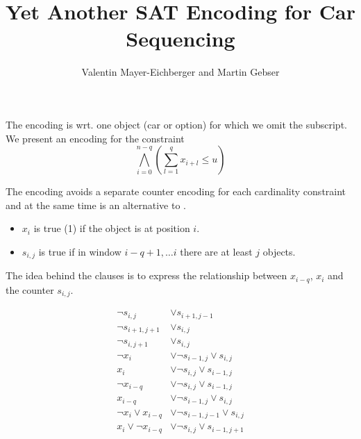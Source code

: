 \documentclass{article}
\title{Yet Another SAT Encoding for Car Sequencing}
\author{Valentin Mayer-Eichberger and Martin Gebser}
\begin{document}
\maketitle

The encoding is wrt. one object (car or option) for which we omit the
subscript. We present an encoding for the constraint
$$\bigwedge_{i=0}^{n-q}(\sum_{l=1}^q x_{i+l} \leq u )$$

The encoding avoids a separate counter encoding for each cardinality
constraint and  at the same time is an alternative to \cite{Mayer13}. 

\begin{itemize}
    \item $x_i$ is true (1) if the object is at position $i$. 
    \item $s_{i,j}$ is true if in window $i-q+1, \ldots i$ there are at least $j$ objects. 
\end{itemize}

The idea behind the clauses is to express the relationship between $x_{i-q}$,
$x_i$ and the counter $s_{i,j}$. 

\begin{align}
    \neg s_{i,j} & \vee s_{i+1,j-1} \\
    \neg s_{i+1,j+1} & \vee s_{i,j} \\
    \neg s_{i,j+1} & \vee s_{i,j} \\
    \neg x_i & \vee \neg s_{i-1,j} \vee s_{i,j} \\
         x_i & \vee \neg s_{i,j} \vee s_{i-1,j} \\
    \neg x_{i-q} & \vee \neg s_{i,j} \vee s_{i-1,j} \\
         x_{i-q} & \vee \neg s_{i-1,j} \vee s_{i,j} \\
    \neg x_i \vee x_{i-q} & \vee \neg s_{i-1,j-1} \vee s_{i,j} \\
         x_i \vee \neg x_{i-q} & \vee \neg s_{i,j} \vee s_{i-1,j+1}
\end{align}






\end{document}
